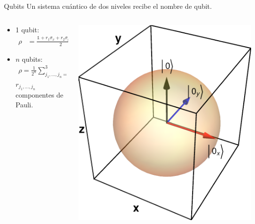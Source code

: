 \documentclass[xcolor=dvipsnames,presentation]{beamer}%
\begin{document}
\begin{frame}{Qubits}
Un sistema cuántico de dos niveles recibe el nombre de qubit. \vfill

	\begin{columns}	\hspace{.4cm}
	\begin{column}{0.6\textwidth}
	\begin{itemize}
		\item 1 qubit:
		\begin{align*}
			\rho &= \frac{\mathds{1}+r_1\sigma_x+r_2\sigma_y+r_3\sigma_z}{2}.
		\end{align*}	
		\item $n$ qubits:
		\begin{align*}
		\rho = \frac{1}{2^n}\sum _{j_1,\ldots,j_n=0}^3 r_{j_1,\ldots,j_n}\cdot
		\sigma_{j_1}\otimes \ldots
		\otimes\sigma_{j_n},%
		\end{align*}
		$r_{j_1,\ldots,j_n}$ componentes de Pauli.
	\end{itemize} \vfill
	\end{column}%
	\begin{column}{0.4\textwidth}  
  		\begin{center}
    		\includegraphics[width=.85\textwidth]{bloch_sphere}      
     \end{center}
		\end{column}
	\end{columns}
\end{frame}
\end{document}
